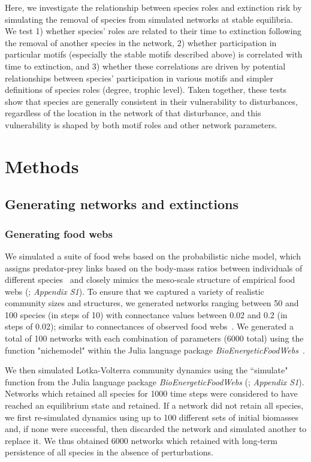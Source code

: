 \documentclass[12pt]{article}
\begin{document}
\begin{spacing}{2.0}
    
    Here, we investigate the relationship between species roles and extinction risk by simulating the removal of species from simulated networks at stable equilibria. We test 1) whether species' roles are related to their time to extinction following the removal of another species in the network, 2) whether participation in particular motifs (especially the stable motifs described above) is correlated with time to extinction, and 3) whether these correlations are driven by potential relationships between species' participation in various motifs and simpler definitions of species roles (degree, trophic level). Taken together, these tests show that species are generally consistent in their vulnerability to disturbances, regardless of the location in the network of that disturbance, and this vulnerability is shaped by both motif roles and other network parameters.


\section*{Methods}

    \subsection*{Generating networks and extinctions}

    	\subsubsection*{Generating food webs}
    
            We simulated a suite of food webs based on the probabilistic niche model, which assigns predator-prey links based on the body-mass ratios between individuals of different species~\citep{Williams2000,Delmas2017} and closely mimics the meso-scale structure of empirical food webs (\citealp{Stouffer2007}; \emph{Appendix S1}).
            To ensure that we captured a variety of realistic community sizes and structures, we generated networks ranging between 50 and 100 species (in steps of 10) with connectance values between 0.02 and 0.2 (in steps of 0.02); similar to connectances of observed food webs~\citep{Dunne2002e}. 
            We generated a total of 100 networks with each combination of parameters (6000 total) using the function "nichemodel" within the Julia language package \emph{BioEnergeticFoodWebs}~\citep{bioenergeticfw,Delmas2017}.


            We then simulated Lotka-Volterra community dynamics using the ``simulate" function from the Julia language package \emph{BioEnergeticFoodWebs} (\citealp{bioenergeticfw,Delmas2017}; \emph{Appendix S1}).
            Networks which retained all species for 1000 time steps were considered to have reached an equilibrium state and retained.
            If a network did not retain all species, we first re-simulated dynamics using up to 100 different sets of initial biomasses and, if none were successful, then discarded the network and simulated another to replace it.
            We thus obtained 6000 networks which retained with long-term persistence of all species in the absence of perturbations.


\end{spacing}
\end{document}
